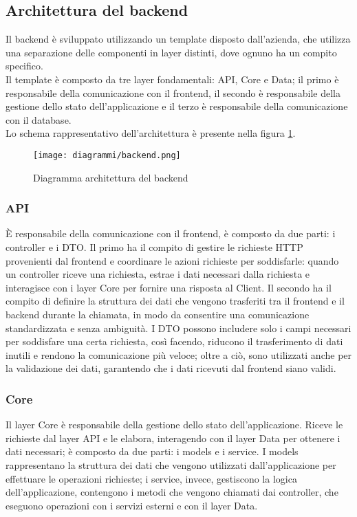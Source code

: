 \subsection{Architettura del backend}
Il backend è sviluppato utilizzando un template disposto dall'azienda, che utilizza una separazione delle componenti in layer distinti, dove ognuno ha un compito specifico.\\
Il template è composto da tre layer fondamentali: API, Core e Data; il primo è responsabile della comunicazione con il frontend, il secondo è responsabile della gestione dello stato dell'applicazione e il terzo è responsabile della comunicazione con il database.\\
Lo schema rappresentativo dell'architettura è presente nella figura \ref{fig:Diagrammabackend}.
\begin{figure}[H] 
    \centering 
    \texttt{[image: diagrammi/backend.png]} 
    \caption{Diagramma architettura del backend}
    \label{fig:Diagrammabackend}
\end{figure}
\subsubsection{API}
È responsabile della comunicazione con il frontend, è composto da due parti: i controller e i \gls{DTO}. Il primo ha il compito di gestire le richieste HTTP provenienti dal frontend e coordinare le azioni richieste per soddisfarle: quando un controller riceve una richiesta, estrae i dati necessari dalla richiesta e interagisce con i layer Core per fornire una risposta al Client. 
Il secondo ha il compito di definire la struttura dei dati che vengono trasferiti tra il frontend e il backend durante la chiamata, in modo da consentire una comunicazione standardizzata e senza ambiguità. I DTO possono includere solo i campi necessari per soddisfare una certa richiesta, così facendo, riducono il trasferimento di dati inutili e rendono la comunicazione più veloce; oltre a ciò, sono utilizzati anche per la validazione dei dati, garantendo che i dati ricevuti dal frontend siano validi.\\
\subsubsection{Core}
Il layer Core è responsabile della gestione dello stato dell'applicazione. Riceve le richieste dal layer API e le elabora, interagendo con il layer Data per ottenere i dati necessari; è composto da due parti: i models e i service. I models rappresentano la struttura dei dati che vengono utilizzati dall'applicazione per effettuare le operazioni richieste; i service, invece, gestiscono la logica dell'applicazione, contengono i metodi che vengono chiamati dai controller, che eseguono operazioni con i servizi esterni e con il layer Data.\\
